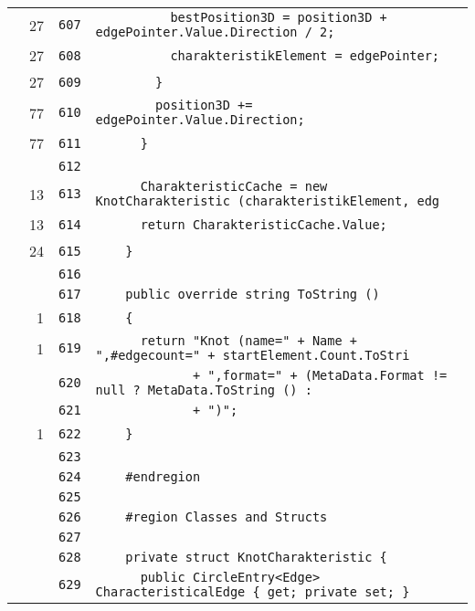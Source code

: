 \documentclass[a4paper,10pt]{article}
\begin{document}
\begin{longtable}[l]{lrrl}
\cellcolor{green} & 27 & \verb~607~ & \verb~          bestPosition3D = position3D + edgePointer.Value.Direction / 2;~\\
\cellcolor{green} & 27 & \verb~608~ & \verb~          charakteristikElement = edgePointer;~\\
\cellcolor{green} & 27 & \verb~609~ & \verb~        }~\\
\cellcolor{green} & 77 & \verb~610~ & \verb~        position3D += edgePointer.Value.Direction;~\\
\cellcolor{green} & 77 & \verb~611~ & \verb~      }~\\
\cellcolor{gray} &  & \verb~612~ & \verb~~\\
\cellcolor{green} & 13 & \verb~613~ & \verb~      CharakteristicCache = new KnotCharakteristic (charakteristikElement, edg~\\
\cellcolor{green} & 13 & \verb~614~ & \verb~      return CharakteristicCache.Value;~\\
\cellcolor{green} & 24 & \verb~615~ & \verb~    }~\\
\cellcolor{gray} &  & \verb~616~ & \verb~~\\
\cellcolor{gray} &  & \verb~617~ & \verb~    public override string ToString ()~\\
\cellcolor{green} & 1 & \verb~618~ & \verb~    {~\\
\cellcolor{green} & 1 & \verb~619~ & \verb~      return "Knot (name=" + Name + ",#edgecount=" + startElement.Count.ToStri~\\
\cellcolor{gray} &  & \verb~620~ & \verb~             + ",format=" + (MetaData.Format != null ? MetaData.ToString () : ~\\
\cellcolor{gray} &  & \verb~621~ & \verb~             + ")";~\\
\cellcolor{green} & 1 & \verb~622~ & \verb~    }~\\
\cellcolor{gray} &  & \verb~623~ & \verb~~\\
\cellcolor{gray} &  & \verb~624~ & \verb~    #endregion~\\
\cellcolor{gray} &  & \verb~625~ & \verb~~\\
\cellcolor{gray} &  & \verb~626~ & \verb~    #region Classes and Structs~\\
\cellcolor{gray} &  & \verb~627~ & \verb~~\\
\cellcolor{gray} &  & \verb~628~ & \verb~    private struct KnotCharakteristic {~\\
\cellcolor{gray} &  & \verb~629~ & \verb~      public CircleEntry<Edge> CharacteristicalEdge { get; private set; }~\\

\end{longtable}
\end{document}
